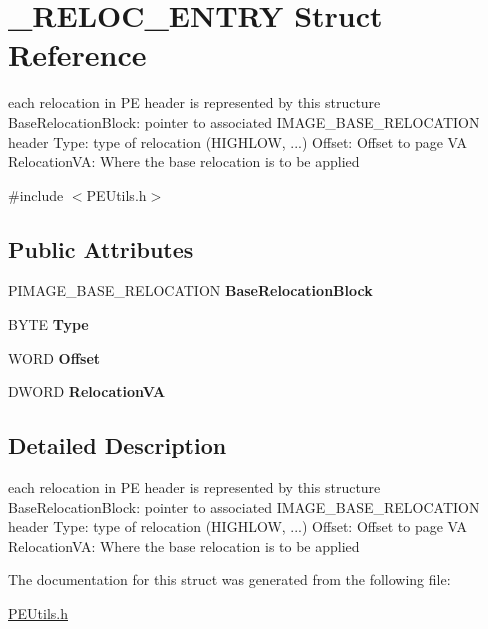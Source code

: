 \hypertarget{struct___r_e_l_o_c___e_n_t_r_y}{}\section{\+\_\+\+R\+E\+L\+O\+C\+\_\+\+E\+N\+T\+RY Struct Reference}
\label{struct___r_e_l_o_c___e_n_t_r_y}


each relocation in PE header is represented by this structure Base\+Relocation\+Block\+: pointer to associated I\+M\+A\+G\+E\+\_\+\+B\+A\+S\+E\+\_\+\+R\+E\+L\+O\+C\+A\+T\+I\+ON header Type\+: type of relocation (H\+I\+G\+H\+L\+OW, ...) Offset\+: Offset to page VA Relocation\+VA\+: Where the base relocation is to be applied  




{\ttfamily \#include $<$P\+E\+Utils.\+h$>$}

\subsection*{Public Attributes}
\begin{DoxyCompactItemize}
\item 
\mbox{\label{struct___r_e_l_o_c___e_n_t_r_y_a0c1219b89b863768070727e24caf19ac}} 
P\+I\+M\+A\+G\+E\+\_\+\+B\+A\+S\+E\+\_\+\+R\+E\+L\+O\+C\+A\+T\+I\+ON {\bfseries Base\+Relocation\+Block}
\item 
\mbox{\label{struct___r_e_l_o_c___e_n_t_r_y_adf7e51dada85744bf30654d4ff27c42b}} 
B\+Y\+TE {\bfseries Type}
\item 
\mbox{\label{struct___r_e_l_o_c___e_n_t_r_y_ad9be68bcc7389b3ae221296afce89593}} 
W\+O\+RD {\bfseries Offset}
\item 
\mbox{\label{struct___r_e_l_o_c___e_n_t_r_y_a21325d69c9d011ab4074e70f0651eb9a}} 
D\+W\+O\+RD {\bfseries Relocation\+VA}
\end{DoxyCompactItemize}


\subsection{Detailed Description}
each relocation in PE header is represented by this structure Base\+Relocation\+Block\+: pointer to associated I\+M\+A\+G\+E\+\_\+\+B\+A\+S\+E\+\_\+\+R\+E\+L\+O\+C\+A\+T\+I\+ON header Type\+: type of relocation (H\+I\+G\+H\+L\+OW, ...) Offset\+: Offset to page VA Relocation\+VA\+: Where the base relocation is to be applied 

The documentation for this struct was generated from the following file\+:\begin{DoxyCompactItemize}
\item 
\mbox{\hyperlink{_p_e_utils_8h}{P\+E\+Utils.\+h}}\end{DoxyCompactItemize}
